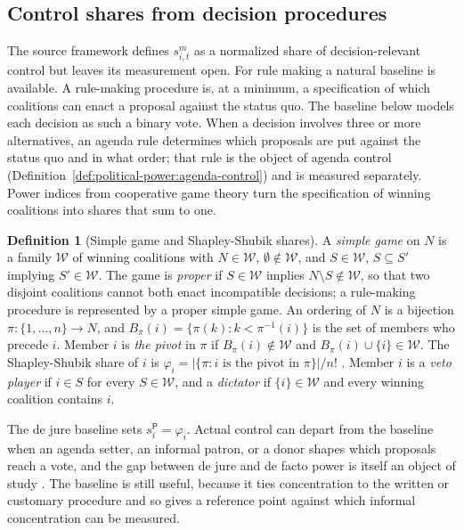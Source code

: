 \documentclass[11pt,letterpaper]{article}
\theoremstyle{definition}
\newtheorem{definition}[theorem]{Definition}
\theoremstyle{remark}
\newcommand{\pP}{\mathsf{P}}
\newcommand{\Win}{\mathcal{W}}
\begin{document}
\subsection{Control shares from decision procedures}

The source framework defines $s^m_{i,t}$ as a normalized share of decision-relevant control but leaves its measurement open. For rule making a natural baseline is available. A rule-making procedure is, at a minimum, a specification of which coalitions can enact a proposal against the status quo. The baseline below models each decision as such a binary vote. When a decision involves three or more alternatives, an agenda rule determines which proposals are put against the status quo and in what order; that rule is the object of agenda control (Definition~\ref{def:political-power:agenda-control}) and is measured separately. Power indices from cooperative game theory turn the specification of winning coalitions into shares that sum to one.

\begin{definition}[Simple game and Shapley-Shubik shares]
\label{def:political-power:shares}
A \emph{simple game} on $N$ is a family $\Win$ of winning coalitions with $N\in\Win$, $\emptyset\notin\Win$, and $S\in\Win$, $S\subseteq S'$ implying $S'\in\Win$. The game is \emph{proper} if $S\in\Win$ implies $N\setminus S\notin\Win$, so that two disjoint coalitions cannot both enact incompatible decisions; a rule-making procedure is represented by a proper simple game. An ordering of $N$ is a bijection $\pi:\{1,\dots,n\}\to N$, and $B_\pi(i)=\{\pi(k):k<\pi^{-1}(i)\}$ is the set of members who precede $i$. Member $i$ is \emph{the pivot} in $\pi$ if $B_\pi(i)\notin\Win$ and $B_\pi(i)\cup\{i\}\in\Win$. The Shapley-Shubik share of $i$ is $\varphi_i=|\{\pi: i \text{ is the pivot in } \pi\}|/n!$ \citep{shapley1954}. Member $i$ is a \emph{veto player} if $i\in S$ for every $S\in\Win$, and a \emph{dictator} if $\{i\}\in\Win$ and every winning coalition contains $i$.
\end{definition}

The de jure baseline sets $s^{\pP}_i=\varphi_i$. Actual control can depart from the baseline when an agenda setter, an informal patron, or a donor shapes which proposals reach a vote, and the gap between de jure and de facto power is itself an object of study \citep{acemoglu2006}. The baseline is still useful, because it ties concentration to the written or customary procedure and so gives a reference point against which informal concentration can be measured.
\end{document}
